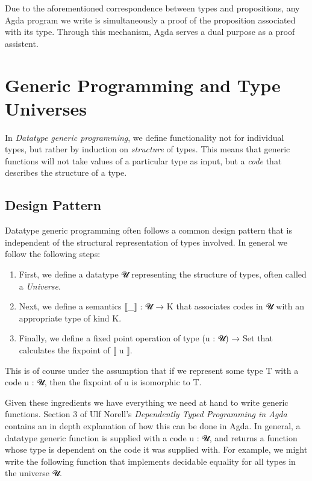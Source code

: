 \documentclass[a4paper,msc,twosized=semi]{uustthesis}
\let\oldemph\emph
\renewcommand\emph[1]{{\large\oldemph{#1}}}
\newcommand{\agda}[1]{{\agdafontinline\color{agdacolor}#1}}
\begin{document}
  Due to the aforementioned correspondence between types and propositions, any Agda 
  program we write is simultaneously a proof of the proposition associated with its 
  type. Through this mechanism, Agda serves a dual purpose as a proof assistent. 

\section{Generic Programming and Type Universes}

  In \emph{Datatype generic programming}, we define functionality not for individual 
  types, but rather by induction on \emph{structure} of types. This means that generic 
  functions will not take values of a particular type as input, but a \emph{code} that 
  describes the structure of a type. 

\subsection{Design Pattern}\label{sec:tudesignpattern}

  Datatype generic programming often follows a common design pattern that is 
  independent of the structural representation of types involved. In general 
  we follow the following steps: 

  \begin{enumerate}
    \item
      First, we define a datatype \agda{𝓤} representing the structure of types, 
      often called a \emph{Universe}. 
    \item 
      Next, we define a semantics \agda{⟦\_⟧ : 𝓤 → K} that associates codes in \agda{𝓤} 
      with an appropriate type of kind \agda{K}. 
    \item 
      Finally, we define a fixed point operation of type \agda{(u : 𝓤) → Set}
      that calculates the fixpoint of \agda{⟦ u ⟧}. 
  \end{enumerate}

  This is of course under the assumption that if we represent some type 
  \agda{T} with a code \agda{u : 𝓤}, then the fixpoint of \agda{u} is isomorphic to \agda{T}. 

  Given these ingredients we have everything we need at hand to write generic 
  functions. Section $3$ of Ulf Norell's \emph{Dependently Typed Programming 
  in Agda} \cite{norell2008dependently} contains an in depth explanation of 
  how this can be done in Agda. In general, a datatype generic function is supplied
  with a code \agda{u : 𝓤}, and returns a function whose type is dependent on the 
  code it was supplied with. For example, we might write the following function 
  that implements decidable equality for all types in the universe \agda{𝓤}. 
\end{document}
